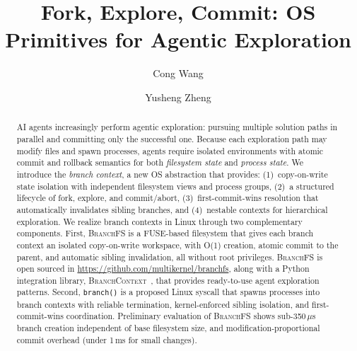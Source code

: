 \documentclass[sigconf]{acmart}
\newcommand{\sys}{\textsc{BranchFS}\xspace}
\newcommand{\syscall}{\texttt{branch()}\xspace}
\begin{document}
\title{Fork, Explore, Commit: OS Primitives for Agentic Exploration}


\author{Cong Wang}

\author{Yusheng Zheng}

\begin{abstract}
	AI agents increasingly perform agentic exploration: pursuing multiple solution paths in parallel and committing only the successful one. Because each exploration path may modify files and spawn processes, agents require isolated environments with atomic commit and rollback semantics for both \emph{filesystem state} and \emph{process state}. We introduce the \emph{branch context}, a new OS abstraction that provides: (1)~copy-on-write state isolation with independent filesystem views and process groups, (2)~a structured lifecycle of fork, explore, and commit/abort, (3)~first-commit-wins resolution that automatically invalidates sibling branches, and (4)~nestable contexts for hierarchical exploration. We realize branch contexts in Linux through two complementary components. First, \sys is a FUSE-based filesystem that gives each branch context an isolated copy-on-write workspace, with O(1) creation, atomic commit to the parent, and automatic sibling invalidation, all without root privileges. \sys is open sourced in \url{https://github.com/multikernel/branchfs}, along with a Python integration library, \textsc{BranchContext}~\cite{branchcontext}, that provides ready-to-use agent exploration patterns. Second, \syscall is a proposed Linux syscall that spawns processes into branch contexts with reliable termination, kernel-enforced sibling isolation, and first-commit-wins coordination. Preliminary evaluation of \sys shows sub-350\,$\mu$s branch creation independent of base filesystem size, and modification-proportional commit overhead (under 1\,ms for small changes).
\end{abstract}


\maketitle
\end{document}
